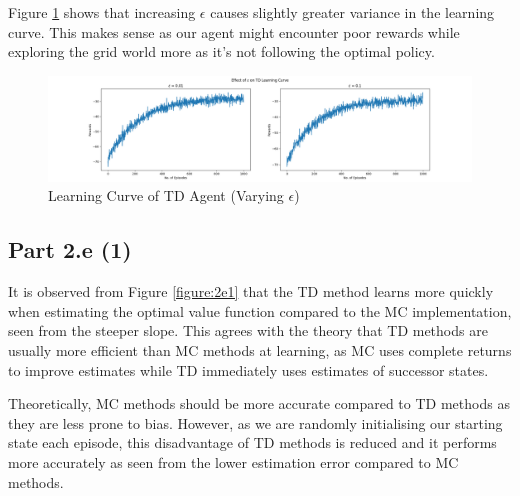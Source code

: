 \documentclass[12pt]{article}
\begin{document}
Figure \ref{figure:2d4_epsilon} shows that increasing \(\epsilon\) causes slightly greater variance in the learning curve. This makes sense as our agent might encounter poor rewards while exploring the grid world more as it's not following the optimal policy.

\begin{figure}[H]
    \centering
    \includegraphics[width=\textwidth]{figures/2d4_epsilon.png}
    \caption{Learning Curve of TD Agent (Varying \(\epsilon\))}
    \label{figure:2d4_epsilon}
\end{figure}

\subsection*{Part 2.e (1)}

It is observed from Figure \ref{figure:2e1} that the TD method learns more quickly when estimating the optimal value function compared to the MC implementation, seen from the steeper slope. This agrees with the theory that TD methods are usually more efficient than MC methods at learning, as MC uses complete returns to improve estimates while TD immediately uses estimates of successor states.\medskip

Theoretically, MC methods should be more accurate compared to TD methods as they are less prone to bias. However, as we are randomly initialising our starting state each episode, this disadvantage of TD methods is reduced and it performs more accurately as seen from the lower estimation error compared to MC methods.
\end{document}
